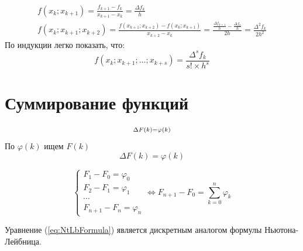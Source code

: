 \documentclass[a4paper,11pt]{article}
\begin{document}
  \begin{gather*}
    f(x_k; x_{k+1}) = \frac{f_{k+1} - f_k}{x_{k+1} - x_k} = \frac{\Delta f_k}{h} \\
    f(x_k; x_{k+1}; x_{k+2}) = \frac{f(x_{k+1}; x_{k+2}) - f(x_k; x_{k+1})}{x_{k+2} - x_k}
        = \frac{\frac{\Delta f_{k+1}}{h} - \frac{\Delta f_k}{h}}{2h} = \frac{\Delta^2 f_k}{2h^2}
  \end{gather*}
  По индукции легко показать, что: \\
  \[f(x_k; x_{k+1}; \dots; x_{k+s}) = \frac{\Delta^s f_k}{s! \times h^s}\]
\newpage

\section{Суммирование функций}
\marginpar
{
  \begin{gather*}
    \begin{subarray}{1}
      \Delta F(k)= \varphi (k) \\
    \end{subarray}
  \end{gather*}
  \footnotesize По $\varphi (k)$ ищем $F(k)$
}
\begin{equation}
  \Delta F(k) = \varphi(k)
\end{equation}

\begin{equation}
  \begin{cases}
    F_1 - F_0 = \varphi_0 \\
    F_2 - F_1 = \varphi_1 \\
    \cdots \\
    F_{n+1} - F_n = \varphi_n
  \end{cases} \Leftrightarrow F_{n+1} - F_0 = \sum_{k=0}^{n} \varphi_k
  \label{eq:NtLbFormula}
\end{equation}

Уравнение (\ref{eq:NtLbFormula}) является дискретным аналогом формулы Ньютона-Лейбница.
\end{document}
